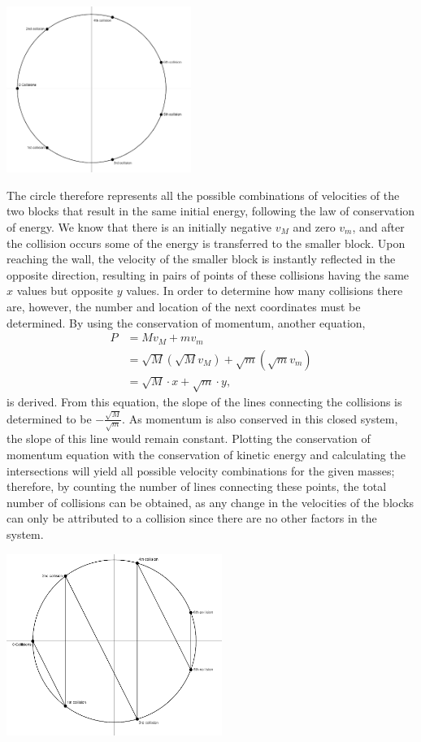 \documentclass{article}
\begin{document}
\begin{multicols}{2}
\begin{center}
    \includegraphics[width=6cm]{liang_2.png}
\end{center}

The circle therefore represents all the possible combinations of velocities of the two blocks that result in the same initial energy, following the law of conservation of energy. We know that there is an initially negative $v_M$ and zero $v_m$, and after the collision occurs some of the energy is transferred to the smaller block. Upon reaching the wall, the velocity of the smaller block is instantly reflected in the opposite direction, resulting in pairs of points of these collisions having the same $x$ values but opposite $y$ values. In order to determine how many collisions there are, however, the number and location of the next coordinates must be determined. By using the conservation of momentum, another equation,
\begin{align*}
    P &= Mv_M + mv_m \\
    &= \sqrt{M}\left(\sqrt{M}v_M\right) + \sqrt{m}\left(\sqrt{m}v_m\right) \\
    &= \sqrt{M} \cdot x + \sqrt{m} \cdot y,
\end{align*}
is derived. From this equation, the slope of the lines connecting the collisions is determined to be $-\frac{\sqrt{M}}{\sqrt{m}}$. As momentum is also conserved in this closed system, the slope of this line would remain constant. Plotting the conservation of momentum equation with the conservation of kinetic energy and calculating the intersections will yield all possible velocity combinations for the given masses; therefore, by counting the number of lines connecting these points, the total number of collisions can be obtained, as any change in the velocities of the blocks can only be attributed to a collision since there are no other factors in the system.

\begin{center}
    \includegraphics[width=7cm]{liang_3.png}
\end{center}


\end{multicols}
\end{document}
